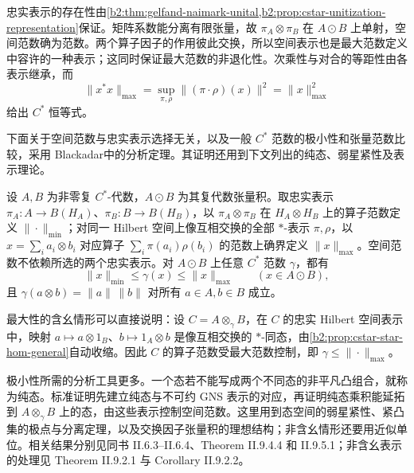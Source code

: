 \ProseParagraphBreak
忠实表示的存在性由\cref{b2:thm:gelfand-naimark-unital,b2:prop:cstar-unitization-representation}保证。矩阵系数能分离有限张量，故 \(\pi_A\otimes\pi_B\) 在 \(A\odot B\) 上单射，空间范数确为范数。两个算子因子的作用彼此交换，所以空间表示也是最大范数定义中容许的一种表示；这同时保证最大范数的非退化性。次乘性与对合的等距性由各表示继承，而
\[
	\|x^*x\|_{\max} =\sup_{\pi,\rho}\|(\pi\cdot\rho)(x)\|^2 =\|x\|_{\max}^2
\]
给出 \(C^*\) 恒等式。

\ProseParagraphBreak
下面关于空间范数与忠实表示选择无关，以及一般 \(C^*\) 范数的极小性和张量范数比较，采用 Blackadar\cite[\nopp II.9.1.3; II.9.5.1--II.9.5.2]{Blackadar2017OperatorAlgebrasCorrected}中的分析定理。其证明还用到下文列出的纯态、弱星紧性及表示理论。

\begin{claim}\label{b2:claim:cstar-tensor-extrema}
	设 \(A,B\) 为非零复 \(C^*\)-代数，\(A\odot B\) 为其复代数张量积。取忠实表示 \(\pi_A:A\to B(H_A)\)、\(\pi_B:B\to B(H_B)\)，以 \(\pi_A\otimes\pi_B\) 在 \(H_A\otimes H_B\) 上的算子范数定义 \(\|\cdot\|_{\min}\)；对同一 Hilbert 空间上像互相交换的全部 \(*\)-表示 \(\pi,\rho\)，以 \(x=\sum_i a_i\otimes b_i\) 对应算子 \(\sum_i\pi(a_i)\rho(b_i)\) 的范数上确界定义 \(\|x\|_{\max}\)。空间范数不依赖所选的两个忠实表示。对 \(A\odot B\) 上任意 \(C^*\) 范数 \(\gamma\)，都有
	\[
		\|x\|_{\min}\le\gamma(x)\le\|x\|_{\max} \qquad(x\in A\odot B),
	\]
	且 \(\gamma(a\otimes b)=\|a\|\,\|b\|\) 对所有 \(a\in A,b\in B\) 成立。
\end{claim}

最大性的含幺情形可以直接说明：设 \(C=A\otimes_\gamma B\)，在 \(C\) 的忠实 Hilbert 空间表示中，映射 \(a\mapsto a\otimes1_B\)、\(b\mapsto1_A\otimes b\) 是像互相交换的 \(*\)-同态，由\cref{b2:prop:cstar-star-hom-general}自动收缩。因此 \(C\) 的算子范数受最大范数控制，即 \(\gamma\le\|\cdot\|_{\max}\)。

\ProseParagraphBreak
极小性所需的分析工具更多。一个态若不能写成两个不同态的非平凡凸组合，就称为纯态。标准证明先建立纯态与不可约 GNS 表示的对应，再证明纯态乘积能延拓到 \(A\otimes_\gamma B\) 上的态，由这些表示控制空间范数。这里用到态空间的弱星紧性、紧凸集的极点与分离定理，以及交换因子张量积的理想结构；非含幺情形还要用近似单位。相关结果分别见同书 II.6.3--II.6.4、Theorem II.9.4.4 和 II.9.5.1；非含幺表示的处理见 Theorem II.9.2.1 与 Corollary II.9.2.2。

